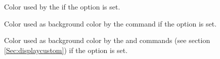\documentclass[12pt]{scrartcl}
\begin{document}
\begin{description}
  \item[]
    Color used by the  if the
     option is set.

  \item[]
    Color used as background color by the 
    command if the  option is set.

  \item[]
    Color used as background color by the
     and  commands (see section
    \ref{Sec:displaycustom}) if the  option is set.
  \end{description}
\end{document}
